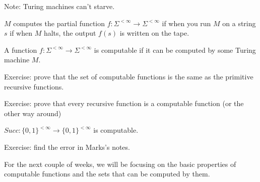 %
Note: Turing machines can't starve.

$M$ computes the partial function $f:\Sigma^{<\infty} \to \Sigma^{<\infty}$ if when you run $M$ on a string $s$ if when $M$ halts, the output $f(s)$ is written on the tape.

A function $f: \Sigma^{<\infty} \to \Sigma^{<\infty}$ is computable if it can be computed by some Turing machine $M$.

Exercise: prove that the set of computable functions is the same as the primitive recursive functions.

Exercise: prove that every recursive function is a computable function (or the other way around)

$Succ : \{0, 1\}^{< \infty} \to  \{0, 1\}^{< \infty}$ is computable.

Exercise: find the error in Marks's notes.



For the next couple of weeks, we will be focusing on the basic properties of computable functions and the sets that can be computed by them.

